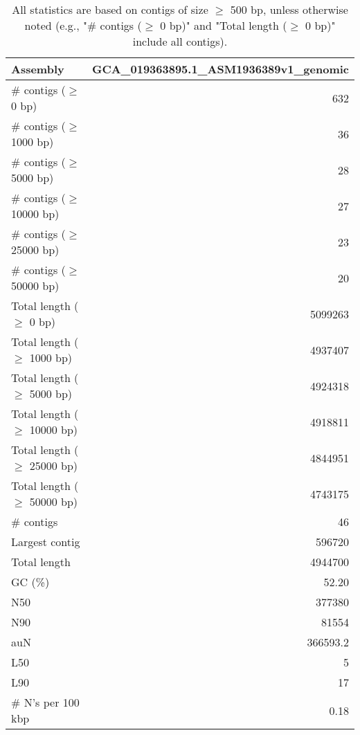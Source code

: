 \documentclass[12pt,a4paper]{article}
\begin{document}
\begin{table}[ht]
\begin{center}
\caption{All statistics are based on contigs of size $\geq$ 500 bp, unless otherwise noted (e.g., "\# contigs ($\geq$ 0 bp)" and "Total length ($\geq$ 0 bp)" include all contigs).}
\begin{tabular}{|l*{1}{|r}|}
\hline
Assembly & GCA\_019363895.1\_ASM1936389v1\_genomic \\ \hline
\# contigs ($\geq$ 0 bp) & 632 \\ \hline
\# contigs ($\geq$ 1000 bp) & 36 \\ \hline
\# contigs ($\geq$ 5000 bp) & 28 \\ \hline
\# contigs ($\geq$ 10000 bp) & 27 \\ \hline
\# contigs ($\geq$ 25000 bp) & 23 \\ \hline
\# contigs ($\geq$ 50000 bp) & 20 \\ \hline
Total length ($\geq$ 0 bp) & 5099263 \\ \hline
Total length ($\geq$ 1000 bp) & 4937407 \\ \hline
Total length ($\geq$ 5000 bp) & 4924318 \\ \hline
Total length ($\geq$ 10000 bp) & 4918811 \\ \hline
Total length ($\geq$ 25000 bp) & 4844951 \\ \hline
Total length ($\geq$ 50000 bp) & 4743175 \\ \hline
\# contigs & 46 \\ \hline
Largest contig & 596720 \\ \hline
Total length & 4944700 \\ \hline
GC (\%) & 52.20 \\ \hline
N50 & 377380 \\ \hline
N90 & 81554 \\ \hline
auN & 366593.2 \\ \hline
L50 & 5 \\ \hline
L90 & 17 \\ \hline
\# N's per 100 kbp & 0.18 \\ \hline
\end{tabular}
\end{center}
\end{table}
\end{document}
